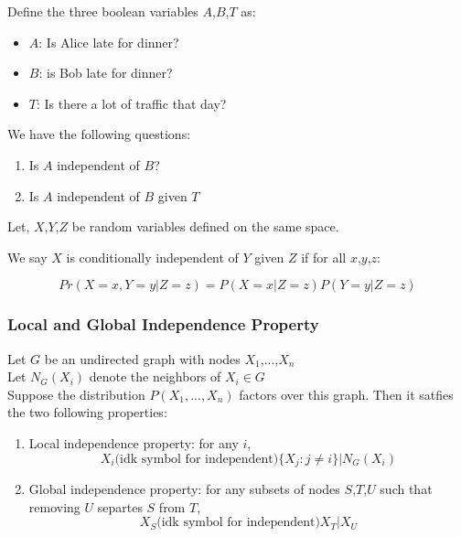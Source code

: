 \documentclass{article}
\begin{document}
\begin{flushleft}
    Define the three boolean variables $A$,$B$,$T$ as:
    \begin{itemize}
        \item $A$: Is Alice late for dinner?
        \item $B$: is Bob late for dinner?
        \item $T$: Is there a lot of traffic that day?
    \end{itemize}
\end{flushleft}
\begin{flushleft}
    We have the following questions:
    \begin{enumerate}
        \item Is $A$ independent of $B$?
        \item Is $A$ independent of $B$ given $T$
    \end{enumerate}
\end{flushleft}
\begin{flushleft}
    Let, $X$,$Y$,$Z$ be random variables defined on the same space.
\end{flushleft}
\begin{flushleft}
    We say $X$ is conditionally independent of $Y$ given $Z$ if for all $x$,$y$,$z$:
\end{flushleft}
$$
Pr(X=x,Y=y|Z=z) = P(X=x|Z=z)P(Y=y|Z=z)
$$

\subsubsection{Local and Global Independence Property}
\begin{flushleft}
    Let $G$ be an undirected graph with nodes $X_1$,...,$X_n$ \\
    Let $N_G(X_i)$ denote the neighbors of $X_i \in G$\\
    Suppose the distribution $P(X_1,...,X_n)$ factors over this graph. Then it satfies the two following properties:
    \begin{enumerate}
        \item Local independence property: for any $i$,
        $$X_i \text{(idk symbol for independent)} \{X_j:j\neq i\}|N_G(X_i)$$
        \item Global independence property: for any subsets of nodes $S$,$T$,$U$ such that removing $U$ separtes $S$ from $T$,
        $$X_S \text{(idk symbol for independent)} X_T | X_U$$
    \end{enumerate} 
\end{flushleft}
\end{document}
